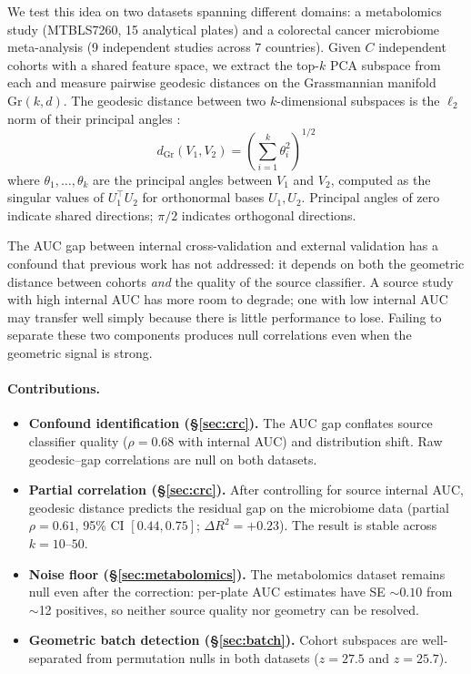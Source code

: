 \documentclass{article}
\begin{document}
We test this idea on two datasets spanning different domains: a metabolomics study (MTBLS7260, 15 analytical plates) and a colorectal cancer microbiome meta-analysis (9 independent studies across 7 countries). Given $C$ independent cohorts with a shared feature space, we extract the top-$k$ PCA subspace from each and measure pairwise geodesic distances on the Grassmannian manifold $\mathrm{Gr}(k, d)$. The geodesic distance between two $k$-dimensional subspaces is the $\ell_2$ norm of their principal angles \citep{bjorck1973numerical, ye2016schubert}:
\begin{equation}
d_{\mathrm{Gr}}(V_1, V_2) = \left(\sum_{i=1}^{k} \theta_i^2\right)^{1/2}
\end{equation}
where $\theta_1, \ldots, \theta_k$ are the principal angles between $V_1$ and $V_2$, computed as the singular values of $U_1^\top U_2$ for orthonormal bases $U_1, U_2$. Principal angles of zero indicate shared directions; $\pi/2$ indicates orthogonal directions.

The AUC gap between internal cross-validation and external validation has a confound that previous work has not addressed: it depends on both the geometric distance between cohorts \emph{and} the quality of the source classifier. A source study with high internal AUC has more room to degrade; one with low internal AUC may transfer well simply because there is little performance to lose. Failing to separate these two components produces null correlations even when the geometric signal is strong.

\paragraph{Contributions.}
\begin{itemize}
\item \textbf{Confound identification (\S\ref{sec:crc}).} The AUC gap conflates source classifier quality ($\rho = 0.68$ with internal AUC) and distribution shift. Raw geodesic--gap correlations are null on both datasets.
\item \textbf{Partial correlation (\S\ref{sec:crc}).} After controlling for source internal AUC, geodesic distance predicts the residual gap on the microbiome data (partial $\rho = 0.61$, 95\% CI $[0.44, 0.75]$; $\Delta R^2 = +0.23$). The result is stable across $k = 10$--$50$.
\item \textbf{Noise floor (\S\ref{sec:metabolomics}).} The metabolomics dataset remains null even after the correction: per-plate AUC estimates have SE $\sim 0.10$ from $\sim$12 positives, so neither source quality nor geometry can be resolved.
\item \textbf{Geometric batch detection (\S\ref{sec:batch}).} Cohort subspaces are well-separated from permutation nulls in both datasets ($z = 27.5$ and $z = 25.7$).
\end{itemize}
\end{document}
